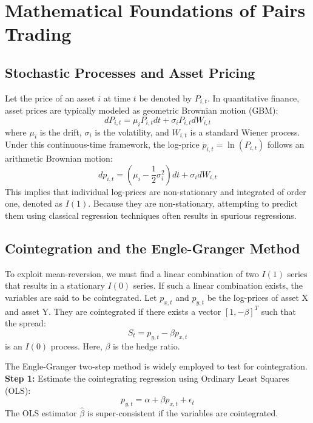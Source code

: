 \documentclass[12pt,a4paper]{article}
\begin{document}
\section{Mathematical Foundations of Pairs Trading}

\subsection{Stochastic Processes and Asset Pricing}
Let the price of an asset $i$ at time $t$ be denoted by $P_{i,t}$. In quantitative finance, asset prices are typically modeled as geometric Brownian motion (GBM):
\begin{equation}
    dP_{i,t} = \mu_i P_{i,t} dt + \sigma_i P_{i,t} dW_{i,t}
\end{equation}
where $\mu_i$ is the drift, $\sigma_i$ is the volatility, and $W_{i,t}$ is a standard Wiener process. Under this continuous-time framework, the log-price $p_{i,t} = \ln(P_{i,t})$ follows an arithmetic Brownian motion:
\begin{equation}
    dp_{i,t} = \left(\mu_i - \frac{1}{2}\sigma_i^2\right)dt + \sigma_i dW_{i,t}
\end{equation}
This implies that individual log-prices are non-stationary and integrated of order one, denoted as $I(1)$. Because they are non-stationary, attempting to predict them using classical regression techniques often results in spurious regressions.

\subsection{Cointegration and the Engle-Granger Method}
To exploit mean-reversion, we must find a linear combination of two $I(1)$ series that results in a stationary $I(0)$ series. If such a linear combination exists, the variables are said to be cointegrated. Let $p_{x,t}$ and $p_{y,t}$ be the log-prices of asset X and asset Y. They are cointegrated if there exists a vector $[1, -\beta]^T$ such that the spread:
\begin{equation}
    S_t = p_{y,t} - \beta p_{x,t}
\end{equation}
is an $I(0)$ process. Here, $\beta$ is the hedge ratio.

The Engle-Granger two-step method is widely employed to test for cointegration. 
\textbf{Step 1:} Estimate the cointegrating regression using Ordinary Least Squares (OLS):
\begin{equation}
    p_{y,t} = \alpha + \beta p_{x,t} + \epsilon_t
\end{equation}
The OLS estimator $\hat{\beta}$ is super-consistent if the variables are cointegrated.
\end{document}
